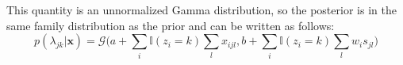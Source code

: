 This quantity is an unnormalized Gamma distribution, so the posterior is in the same family distribution as the prior and can be written as follows:
\begin{equation} \label{posterior-poisson-final-app}
  	p(\lambda_{jk} | \mathbf{x}) = \mathcal{G}\bigg(a + \sum\limits_{i} \mathbb{I}(z_{i}=k) \sum\limits_{l} x_{ijl}, b + \sum\limits_{i} \mathbb{I}(z_{i}=k) \sum\limits_{l} w_{i}s_{jl} \bigg)
\end{equation}
 

